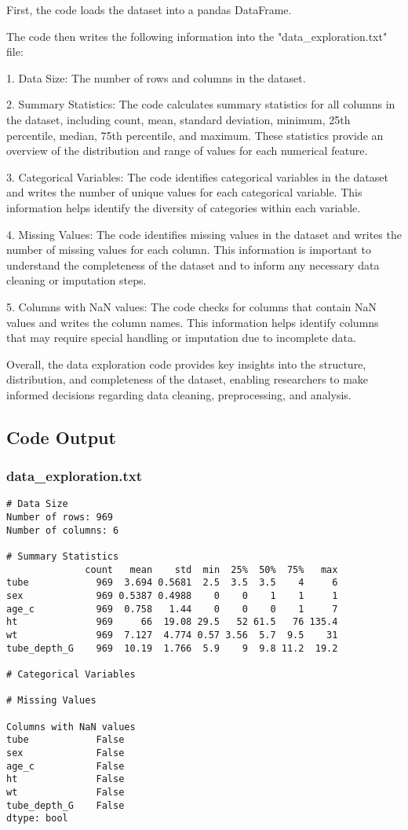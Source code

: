 \documentclass[11pt]{article}
\begin{document}
First, the code loads the dataset into a pandas DataFrame. 

The code then writes the following information into the "data\_exploration.txt" file:

1. Data Size: The number of rows and columns in the dataset.

2. Summary Statistics: The code calculates summary statistics for all columns in the dataset, including count, mean, standard deviation, minimum, 25th percentile, median, 75th percentile, and maximum. These statistics provide an overview of the distribution and range of values for each numerical feature.

3. Categorical Variables: The code identifies categorical variables in the dataset and writes the number of unique values for each categorical variable. This information helps identify the diversity of categories within each variable.

4. Missing Values: The code identifies missing values in the dataset and writes the number of missing values for each column. This information is important to understand the completeness of the dataset and to inform any necessary data cleaning or imputation steps.

5. Columns with NaN values: The code checks for columns that contain NaN values and writes the column names. This information helps identify columns that may require special handling or imputation due to incomplete data.

Overall, the data exploration code provides key insights into the structure, distribution, and completeness of the dataset, enabling researchers to make informed decisions regarding data cleaning, preprocessing, and analysis.

\subsection{Code Output}

\subsubsection*{data\_exploration.txt}

\begin{Verbatim}[tabsize=4]
# Data Size
Number of rows: 969
Number of columns: 6

# Summary Statistics
              count   mean    std  min  25%  50%  75%   max
tube            969  3.694 0.5681  2.5  3.5  3.5    4     6
sex             969 0.5387 0.4988    0    0    1    1     1
age_c           969  0.758   1.44    0    0    0    1     7
ht              969     66  19.08 29.5   52 61.5   76 135.4
wt              969  7.127  4.774 0.57 3.56  5.7  9.5    31
tube_depth_G    969  10.19  1.766  5.9    9  9.8 11.2  19.2

# Categorical Variables

# Missing Values

Columns with NaN values
tube            False
sex             False
age_c           False
ht              False
wt              False
tube_depth_G    False
dtype: bool

\end{Verbatim}
\end{document}
